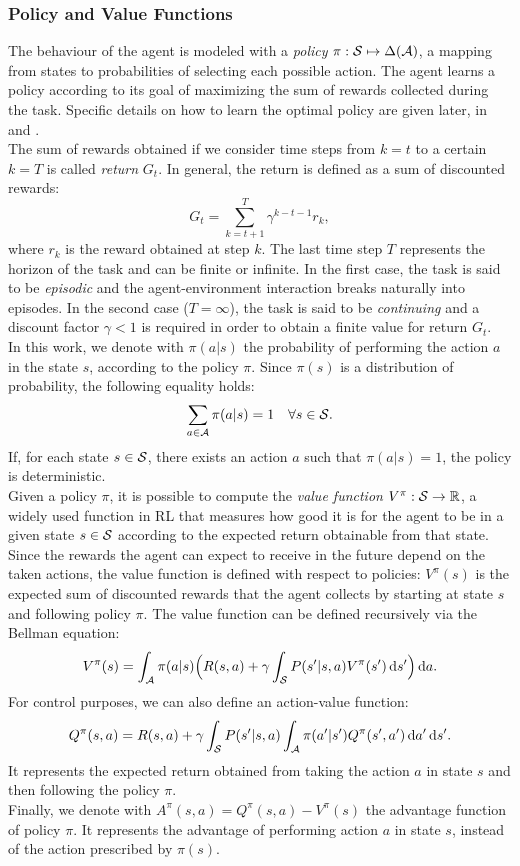 \subsubsection{Policy and Value Functions}
The behaviour of the agent is modeled with a \emph{policy} $\pi: \mathcal{S} \mapsto \Delta(\mathcal{A})$, \ie a mapping from states to probabilities of selecting each possible action. The agent learns a policy according to its goal of maximizing the sum of rewards collected during the task. Specific details on how to learn the optimal policy are given later, in  and .\\
The sum of rewards obtained if we consider time steps from $k=t$ to a certain $k=T$ is called \emph{return} $G_t$. In general, the return is defined as a sum of discounted rewards:
$$G_t = \sum_{k=t+1}^{T} \gamma^{k-t-1} r_k, $$where $r_k$ is the reward obtained at step $k$. The last time step $T$ represents the horizon of the task and can be finite or infinite. In the first case, the task is said to be \emph{episodic} and the agent-environment interaction breaks naturally into episodes. In the second case (\ie $T = \infty$), the task is said to be \emph{continuing} and a discount factor $\gamma<1$ is required in order to obtain a finite value for return $G_t$.\\
\newline
In this work, we denote with $\pi(a|s)$ the probability of performing the action $a$ in the state $s$, according to the policy $\pi$. Since $\pi(s)$ is a distribution of probability, the following equality holds:
$$\sum_{a \in \mathcal{A}} \pi(a|s) = 1 \quad \forall s \in \mathcal{S}.$$
If, for each state $s \in \mathcal{S}$, there exists an action $a$ such that $\pi(a|s) = 1$, the policy is deterministic.\\
\newline
Given a policy $\pi$, it is possible to compute the \emph{value function} $V^{\pi}: \mathcal{S} \rightarrow \mathbb{R}$, a widely used function in \ac{RL} that measures how good it is for the agent to be in a given state $s \in \mathcal{S}$ according to the expected return obtainable from that state. Since the rewards the agent can expect to receive in the future depend on the taken actions, the value function is defined with respect to policies: $V^{\pi}(s)$ is the expected sum of discounted rewards that the agent collects by starting at state $s$ and following policy $\pi$. The value function can be defined recursively via the Bellman equation: $$V^{\pi}(s) = \int_{\mathcal{A}} \pi(a|s) \Big(R(s,a) + \gamma \int_{\mathcal{S}}P(s'|s,a)V^{\pi}(s')\,\mathrm{d} s' \Big) \,\mathrm{d} a.$$
For control purposes, we can also define an action-value function: $$Q^{\pi}(s,a) = R(s,a) + \gamma \int_{\mathcal{S}} P(s'|s,a) \int_{\mathcal{A}} \pi(a'|s') Q^{\pi}(s',a') \,\mathrm{d} a' \,\mathrm{d} s'.$$
It represents the expected return obtained from taking the action $a$ in state $s$ and then following the policy $\pi$. \\
Finally, we denote with $A^{\pi}(s,a) = Q^{\pi}(s,a) - V^{\pi}(s)$ the advantage function of policy $\pi$. It represents the advantage of performing action $a$ in state $s$, instead of the action prescribed by $\pi(s)$.

